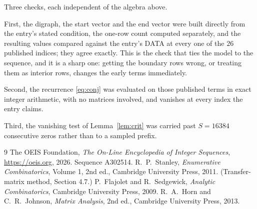 \documentclass[11pt,a4paper]{article}
\theoremstyle{plain}
\theoremstyle{definition}
\begin{document}
Three checks, each independent of the algebra above.

First, the digraph, the start vector and the end vector were built directly from the
entry's stated condition, the one-row count computed separately, and the resulting values
compared against the entry's DATA at every one of the $26$ published indices; they
agree exactly. This is the check that ties the model to the sequence, and it is a sharp one:
getting the boundary rows wrong, or treating them as interior rows, changes the early terms
immediately.

Second, the recurrence \eqref{eq:conj} was evaluated on those published terms in exact
integer arithmetic, with no matrices involved, and vanishes at every index the entry claims.

Third, the vanishing test of Lemma~\ref{lem:crit} was carried past $S=16384$ consecutive
zeros rather than to a sampled prefix.

\begin{thebibliography}{9}
 The OEIS Foundation, \emph{The On-Line Encyclopedia of Integer
Sequences}, \url{https://oeis.org}, 2026. Sequence A302514.
 R.~P.~Stanley, \emph{Enumerative Combinatorics}, Volume 1, 2nd ed.,
Cambridge University Press, 2011. (Transfer-matrix method, Section 4.7.)
 P.~Flajolet and R.~Sedgewick, \emph{Analytic Combinatorics}, Cambridge
University Press, 2009.
 R.~A.~Horn and C.~R.~Johnson, \emph{Matrix Analysis}, 2nd ed., Cambridge
University Press, 2013.
\end{thebibliography}
\end{document}
